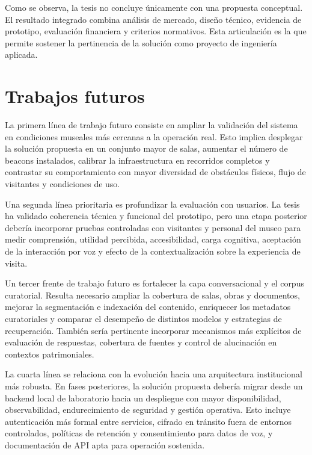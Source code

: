 Como se observa, la tesis no concluye únicamente con una propuesta conceptual. El resultado integrado combina análisis de mercado, diseño técnico, evidencia de prototipo, evaluación financiera y criterios normativos. Esta articulación es la que permite sostener la pertinencia de la solución como proyecto de ingeniería aplicada.

\section{Trabajos futuros}

La primera línea de trabajo futuro consiste en ampliar la validación del sistema en condiciones museales más cercanas a la operación real. Esto implica desplegar la solución propuesta en un conjunto mayor de salas, aumentar el número de beacons instalados, calibrar la infraestructura en recorridos completos y contrastar su comportamiento con mayor diversidad de obstáculos físicos, flujo de visitantes y condiciones de uso.

Una segunda línea prioritaria es profundizar la evaluación con usuarios. La tesis ha validado coherencia técnica y funcional del prototipo, pero una etapa posterior debería incorporar pruebas controladas con visitantes y personal del museo para medir comprensión, utilidad percibida, accesibilidad, carga cognitiva, aceptación de la interacción por voz y efecto de la contextualización sobre la experiencia de visita.

Un tercer frente de trabajo futuro es fortalecer la capa conversacional y el corpus curatorial. Resulta necesario ampliar la cobertura de salas, obras y documentos, mejorar la segmentación e indexación del contenido, enriquecer los metadatos curatoriales y comparar el desempeño de distintos modelos y estrategias de recuperación. También sería pertinente incorporar mecanismos más explícitos de evaluación de respuestas, cobertura de fuentes y control de alucinación en contextos patrimoniales.

La cuarta línea se relaciona con la evolución hacia una arquitectura institucional más robusta. En fases posteriores, la solución propuesta debería migrar desde un backend local de laboratorio hacia un despliegue con mayor disponibilidad, observabilidad, endurecimiento de seguridad y gestión operativa. Esto incluye autenticación más formal entre servicios, cifrado en tránsito fuera de entornos controlados, políticas de retención y consentimiento para datos de voz, y documentación de API apta para operación sostenida.

